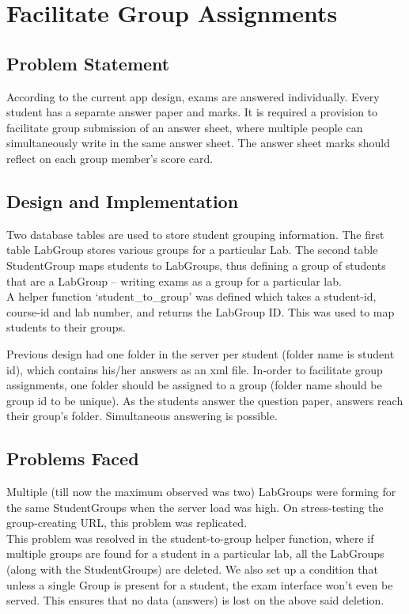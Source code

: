\section{Facilitate Group Assignments}

\subsection{Problem Statement}
According to the current app design, exams are answered individually. Every student has a separate answer paper and marks. It is required a provision to facilitate group submission of an answer sheet, where multiple people can simultaneously write in the same answer sheet. The answer sheet marks should reflect on each group member's score card.

\subsection{Design and Implementation}
Two database tables are used to store student grouping information. The first table LabGroup stores various groups for a particular Lab. The second table StudentGroup maps students to LabGroups, thus defining a group of students that are a LabGroup -- writing exams as a group for a particular lab.\\

A helper function `student\_to\_group' was defined which takes a student-id, course-id and lab number, and returns the LabGroup ID. This was used to map students to their groups.

Previous design had one folder in the server per student (folder name is student id), which contains his/her answers as an xml file. In-order to facilitate group assignments, one folder should be assigned to a group (folder name should be group id to be unique). As the students answer the question paper, answers reach their group's folder. Simultaneous answering is possible.

\subsection{Problems Faced}
Multiple (till now the maximum observed was two) LabGroups were forming for the same StudentGroups when the server load was high. On stress-testing the group-creating URL, this problem was replicated.\\
This problem was resolved in the student-to-group helper function, where if multiple groups are found for a student in a particular lab, all the LabGroups (along with the StudentGroups) are deleted. We also set up a condition that unless a single Group is present for a student, the exam interface won't even be served. This ensures that no data (answers) is lost on the above said deletion.
